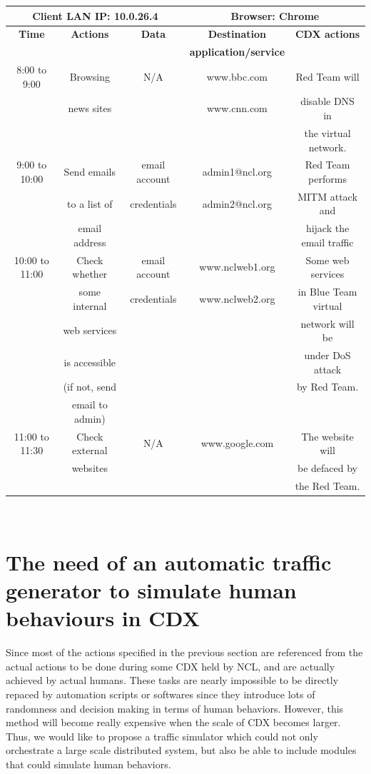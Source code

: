 \documentclass[12pt]{report}
\begin{document}
\setlength{\parindent}{0pt}
\begin{tabular}{ | c | c | c | c | c |}
\hline
\multicolumn{3}{|c|}{Client LAN IP: 10.0.26.4}&\multicolumn{2}{|c|}{Browser: Chrome}\\
\hline
\hline
\textbf{Time} & \textbf{Actions} & \textbf{Data} & \textbf{Destination} & \textbf{CDX actions}\\
& & & \textbf{application/service} & \\
\hline
8:00 to 9:00 & Browsing & N/A & www.bbc.com & Red Team will\\
& news sites & & www.cnn.com & disable DNS in \\
& & & & the virtual network.\\
\hline
9:00 to 10:00 & Send emails & email account & admin1@ncl.org & Red Team performs\\
& to a list of & credentials & admin2@ncl.org & MITM attack and \\
& email address & & & hijack the email traffic\\
\hline
10:00 to 11:00 & Check whether & email account & www.nclweb1.org & Some web services\\
& some internal & credentials  & www.nclweb2.org & in Blue Team virtual \\
& web services & & & network will be \\
& is accessible & & & under DoS attack\\
& (if not, send & & & by Red Team.\\
& email to admin) & & & \\
\hline
11:00 to 11:30 & Check external & N/A & www.google.com & The website will\\
& websites & & & be defaced by\\
& & & & the Red Team. \\
\hline
\end{tabular}\\

\section{The need of an automatic traffic generator to simulate human behaviours in CDX} \label{assumption}
Since most of the actions specified in the previous section are referenced from the actual actions to be done during some CDX held by NCL, and are actually achieved by actual humans. These tasks are nearly impossible to be directly repaced by automation scripts or softwares since they introduce lots of randomness and decision making in terms of human behaviors. However, this method will become really expensive when the scale of CDX becomes larger. Thus, we would like to propose a traffic simulator which could not only orchestrate a large scale distributed system, but also be able to include modules that could simulate human behaviors.\\
\end{document}
